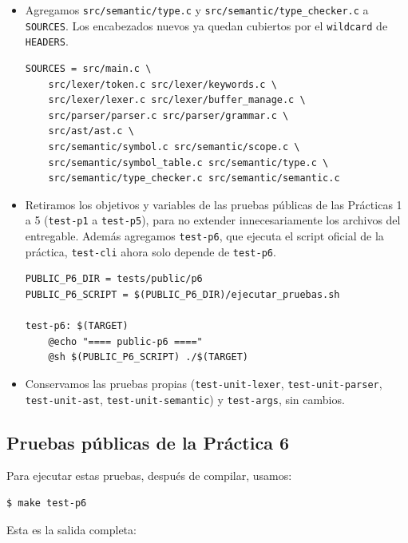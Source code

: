 \documentclass[12pt,letterpaper]{article}
\begin{document}
\begin{itemize}
\item Agregamos \texttt{src/semantic/type.c} y \texttt{src/semantic/type\_checker.c} a \texttt{SOURCES}. Los
  encabezados nuevos ya quedan cubiertos por el \texttt{wildcard} de \texttt{HEADERS}.

\begin{verbatim}
SOURCES = src/main.c \
	src/lexer/token.c src/lexer/keywords.c \
	src/lexer/lexer.c src/lexer/buffer_manage.c \
	src/parser/parser.c src/parser/grammar.c \
	src/ast/ast.c \
	src/semantic/symbol.c src/semantic/scope.c \
	src/semantic/symbol_table.c src/semantic/type.c \
	src/semantic/type_checker.c src/semantic/semantic.c
\end{verbatim}

\item Retiramos los objetivos y variables de las pruebas públicas de las Prácticas 1 a 5 (\texttt{test-p1}
  a \texttt{test-p5}), para no extender innecesariamente los archivos del entregable.
  Además agregamos \texttt{test-p6}, que ejecuta el script oficial de la práctica, \texttt{test-cli} ahora solo
  depende de \texttt{test-p6}.

\begin{verbatim}
PUBLIC_P6_DIR = tests/public/p6
PUBLIC_P6_SCRIPT = $(PUBLIC_P6_DIR)/ejecutar_pruebas.sh

test-p6: $(TARGET)
	@echo "==== public-p6 ===="
	@sh $(PUBLIC_P6_SCRIPT) ./$(TARGET)
\end{verbatim}

\item Conservamos las pruebas propias (\texttt{test-unit-lexer}, \texttt{test-unit-parser},
  \texttt{test-unit-ast}, \texttt{test-unit-semantic}) y \texttt{test-args}, sin cambios.
\end{itemize}

\subsection*{Pruebas públicas de la Práctica 6}

Para ejecutar estas pruebas, después de compilar, usamos:
\begin{verbatim}
$ make test-p6
\end{verbatim}

Esta es la salida completa:
\end{document}
